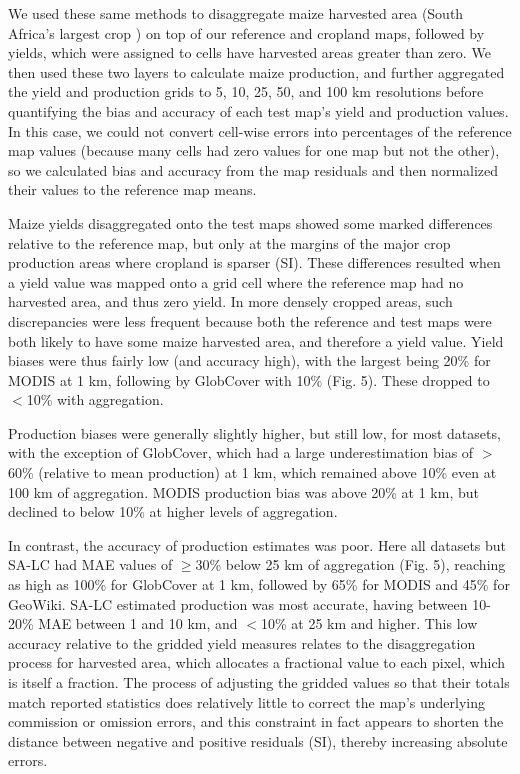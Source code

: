 \documentclass{pnastwo2}
\begin{document}
\begin{article}
We used these same methods  \cite{ramankutty_farming_2008,monfreda_farming_2008} to disaggregate maize harvested area (South Africa's largest crop \cite{estes_projected_2013}) on top of our reference and cropland maps, followed by yields, which were assigned to cells have harvested areas greater than zero. We then used these two layers to calculate maize production, and further aggregated the yield and production grids to 5, 10, 25, 50, and 100 km resolutions before quantifying the bias and accuracy of each test map's yield and production values. In this case, we could not convert cell-wise errors into percentages of the reference map values (because many cells had zero values for one map but not the other), so we calculated bias and accuracy from the map residuals and then normalized their values to the reference map means. 

Maize yields disaggregated onto the test maps showed some marked differences relative to the reference map, but only at the margins of the major crop production areas where cropland is sparser (SI). These differences resulted when a yield value was mapped onto a grid cell where the reference map had no harvested area, and thus zero yield. In more densely cropped areas, such discrepancies were less frequent because both the reference and test maps were both likely to have some maize harvested area, and therefore a yield value.  Yield biases were thus fairly low (and accuracy high), with the largest being 20\% for MODIS at 1 km, following by GlobCover with 10\% (Fig. 5). These dropped to $<$10\% with aggregation.  

Production biases were generally slightly higher, but still low, for most datasets, with the exception of GlobCover, which had a large underestimation bias of $>$60\% (relative to mean production) at 1 km, which remained above 10\% even at 100 km of aggregation. MODIS production bias was above 20\% at 1 km, but declined to below 10\% at higher levels of aggregation.  

In contrast, the accuracy of production estimates was poor. Here all datasets but SA-LC had MAE values of $\geq$30\% below 25 km of aggregation (Fig. 5), reaching as high as 100\% for GlobCover at 1 km, followed by 65\% for MODIS and 45\% for GeoWiki. SA-LC estimated production was most accurate, having between 10-20\% MAE between 1 and 10 km, and $<$10\% at 25 km and higher.  This low accuracy relative to the gridded yield measures relates to the disaggregation process for harvested area, which allocates a fractional value to each pixel, which is itself a fraction. The process of adjusting the gridded values so that their totals match reported statistics does relatively little to correct the map's underlying commission or omission errors, and this constraint in fact appears to shorten the distance between negative and positive residuals (SI), thereby increasing absolute errors.  


\end{article}
\end{document}
